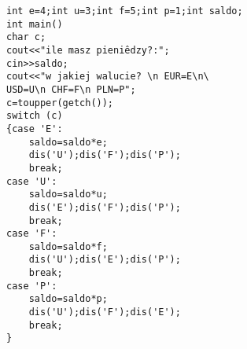 \begin{verbatim}
int e=4;int u=3;int f=5;int p=1;int saldo;
int main() 
char c;
cout<<"ile masz pieniêdzy?:";
cin>>saldo;
cout<<"w jakiej walucie? \n EUR=E\n\
USD=U\n CHF=F\n PLN=P";
c=toupper(getch());
switch (c)
{case 'E':
	saldo=saldo*e;
	dis('U');dis('F');dis('P');
	break; 
case 'U':
	saldo=saldo*u;
	dis('E');dis('F');dis('P');
	break; 
case 'F':
	saldo=saldo*f;
	dis('U');dis('E');dis('P');
	break; 
case 'P':
	saldo=saldo*p;
	dis('U');dis('F');dis('E');
	break; 
}
\end{verbatim}